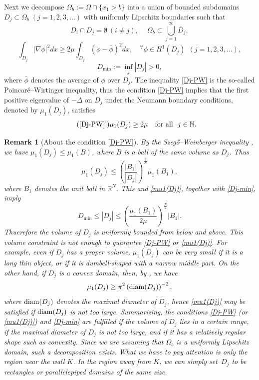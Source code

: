 \documentclass[a4paper,12pt,fullpage]{article}
\numberwithin{equation}{section}
\newtheorem{Rk}[Lemma]{Remark}
\def\R{{\mathbb R}}
\def\N{{\mathbb N}}
\begin{document}
Next we decompose $\Omega_b :=\Omega\cap\{x_1> b\}$ into a union of bounded subdomains $D_j\subset\Omega_b \;(j=1,2,3,\ldots)$ with uniformly Lipschitz boundaries such that
\begin{equation}\label{Dj-Omega}
D_i\cap D_j=\emptyset\ (i\ne j),\quad \ \Omega_b \subset \bigcup_{j=1}^\infty \overline{D}_j,
\end{equation}
\begin{equation}\label{Dj-PW}
\int_{D_j}|\nabla \phi|^2 dx \geq 2\mu \int_{D_j}\left(\phi-\bar\phi\right)^2 dx,\quad 
{}^\forall\phi\in H^1(D_j) \ \ (j=1,2,3,\ldots),
\end{equation}
\begin{equation}\label{Dj-min}
D_{\min} :=\inf_{j}|D_j|>0,
\end{equation}
where $\bar\phi$ denotes the average of $\phi$ over $D_j$. The inequality \eqref{Dj-PW} is the so-called Poincar\'e--Wirtinger inequality, thus the condition \eqref{Dj-PW} implies that the first positive eigenvalue of $-\Delta$ on $D_j$ under the Neumann boundary conditions, denoted by $\mu_1(D_j)$, satisfies
\begin{equation}\label{mu1(Dj)}\tag{\ref{Dj-PW}'}
\mu_1(D_j)\geq 2\mu\quad \hbox{for all}\ \ j\in\N.
\end{equation}

\begin{Rk}[About the condition \eqref{Dj-PW}]\label{rk:Dj}
By the Szeg\H{o}--Weinberger inequality \cite{W}, we have $\mu_1(D_j)\leq \mu_1(B)$, where $B$ is a ball of the same volume as $D_j$. Thus
\[
\mu_1(D_j)\leq \left(\frac{|B_1|}{|D_j|}\right)^{\frac{2}{N}} \mu_1(B_1),
\]
where $B_1$ denotes the unit ball in $\R^N$. This and \eqref{mu1(Dj)}, together with \eqref{Dj-min}, imply
\begin{equation}\label{Dj-volume}
D_{\min}\leq |D_j|\leq \left(\frac{\mu_1(B_1)}{2\mu}\right)^{\frac N2} |B_1|.
\end{equation}
Thuerefore the volume of $D_j$ is uniformly bounded from below and above. This volume constraint is not enough to guarantee \eqref{Dj-PW} or \eqref{mu1(Dj)}. For example, even if $D_j$ has a proper volume, $\mu_1(D_j)$ can be very small if it is a long thin object, or if it is dumbell-shaped with a narrow middle part. On the other hand, if $D_j$ is a convex domain, then, by \cite{PW}, we have
\[
\mu_1(D_j)\geq \pi^2 \left({\rm diam}(D_j)\right)^{-2},
\]
where ${\rm diam}(D_j)$ denotes the maximal diameter of $D_j$, hence \eqref{mu1(Dj)} may be satisfied if ${\rm diam}(D_j)$ is not too large. Summarizing, the conditions \eqref{Dj-PW} (or \eqref{mu1(Dj)}) and \eqref{Dj-min} are fulfilled if the volume of $D_j$ lies in a certain range, if the maximal diameter of $D_j$ is not too large, and if it has a relatively regular shape such as convexity. Since we are assuming that $\Omega_b$ is a uniformly Lipschitz domain, such a decomposition exists.  What we have to pay attention is only the region near the wall $K$. In the region away from $K$, we can simply set~$D_j$ to be rectangles or parallelepiped domains of the same size.    
\end{Rk}
\end{document}
